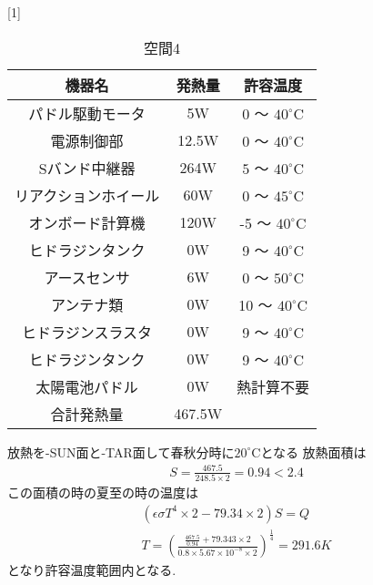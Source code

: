\documentclass[15pt,uplatex,dvipdfmx]{jsarticle}
\begin{document}
\begin{table}[H]
  \begin{center}
  \caption{空間4}
  \scalebox{1}[1]{
  \begin{tabular}{|c|c|c|} \hline
    機器名 &  発熱量 & 許容温度 \\ \hline

  パドル駆動モータ
  & 5W
  & 0 〜 ${40}^\circ\mathrm{C}$\\

  電源制御部
  & 12.5W
  & 0 〜 ${40}^\circ\mathrm{C}$\\

  Sバンド中継器
  & 264W
  & $5$ 〜 ${40}^\circ\mathrm{C}$\\

  リアクションホイール
  & 60W
  & 0 〜 ${45}^\circ\mathrm{C}$\\

  オンボード計算機
  & 120W
  & -5 〜 ${40}^\circ\mathrm{C}$\\

  ヒドラジンタンク
  & 0W
  & 9 〜 ${40}^\circ\mathrm{C}$\\

  アースセンサ
  & 6W
  & 0 〜 ${50}^\circ\mathrm{C}$\\

  アンテナ類
  & 0W
  & 10 〜 ${40}^\circ\mathrm{C}$\\

  ヒドラジンスラスタ
  & 0W
  & 9 〜 ${40}^\circ\mathrm{C}$\\

  ヒドラジンタンク
  & 0W
  & 9 〜 ${40}^\circ\mathrm{C}$\\

  太陽電池パドル
  & 0W
  &  熱計算不要\\ \hline

  合計発熱量
  & 467.5W
  & \\\hline
  \end{tabular}
  }
\end{center}
\end{table}
放熱を-SUN面と-TAR面して春秋分時に${20}^\circ\mathrm{C}$となる
放熱面積は
\begin{eqnarray}
  S=\frac{467.5}{248.5\times2}=0.94<2.4
\end{eqnarray}
この面積の時の夏至の時の温度は
\begin{eqnarray}
  (\epsilon\sigma T^4\times2 -79.34\times2)S=Q\\
  T =(\frac{\frac{467.5}{0.94}+79.343\times2}
  {0.8\times5.67\times10^{-8}\times2})^{\frac{1}{4}}=291.6K
\end{eqnarray}
となり許容温度範囲内となる.
\end{document}
